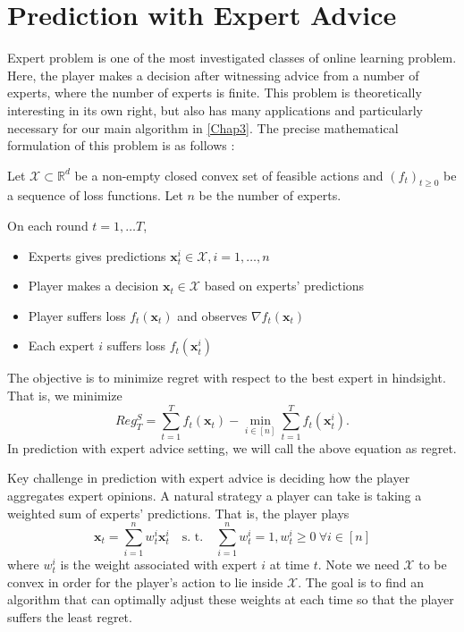 \documentclass[12pt, a4paper]{report}
\begin{document}
\section{Prediction with Expert Advice}\label{section:expert-advice}
Expert problem is one of the most investigated classes of online learning problem. Here, the player makes a decision after witnessing advice from a number of experts, where the number of experts is finite. This problem is theoretically interesting in its own right, but also has many applications and particularly necessary for our main algorithm in \ref{Chap3}. The precise mathematical formulation of this problem is as follows \cite{CesaBianchi2006PredictionLA}:
\begin{defn}
Let $\mathcal{X} \subset \mathbb{R}^d$ be a non-empty closed convex set of feasible actions and $(f_t)_{t \geq 0}$ be a sequence of loss functions. Let $n$ be the number of experts. 

On each round $t = 1, \dots T$,
\begin{itemize}
    \item Experts gives predictions $\mathbf{x}_t^{i} \in \mathcal{X}, i = 1, \dots, n$
    \item Player makes a decision $\mathbf{x}_t \in \mathcal{X}$ based on experts'
     predictions
    \item Player suffers loss $f_t(\mathbf{x}_t)$ and observes $\nabla f_t(\mathbf{x}_t)$
    \item Each expert $i$ suffers loss $f_t(\mathbf{x}_t^{i})$
\end{itemize}
The objective is to minimize regret with respect to the best expert in hindsight. That is, we minimize
\begin{equation*}
     Reg_T^S = \sum_{t=1}^T f_t(\mathbf{x}_t) - \min_{i \in [n]} \sum_{t=1}^T f_t(\mathbf{x}_t^{i}).
\end{equation*}
In prediction with expert advice setting, we will call the above equation as regret.
\end{defn}

Key challenge in prediction with expert advice is deciding how the player aggregates expert opinions. A natural strategy a player can take is taking a weighted sum of experts' predictions. That is, the player plays 
\begin{equation*}
    \mathbf{x}_t = \sum_{i=1}^n w_t^i \mathbf{x}_t^{i} \quad \text{s. t.} \quad \sum_{i=1}^n w_t^{i} = 1, w_t^{i} \geq 0\ \forall i \in [n]
\end{equation*}
where $w_t^i$ is the weight associated with expert $i$ at time $t$. Note we need $\mathcal{X}$ to be convex in order for the player's action to lie inside $\mathcal{X}$. The goal is to find an algorithm that can optimally adjust these weights at each time so that the player suffers the least regret. 
\end{document}
